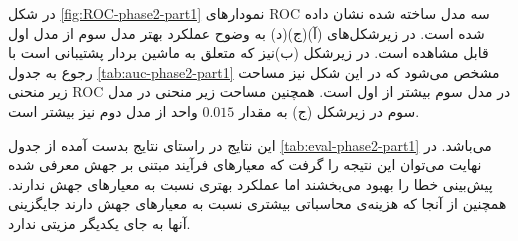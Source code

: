 در شکل \ref{fig:ROC-phase2-part1} نمودارهای ROC سه مدل ساخته شده نشان داده شده است. در زیرشکل‌های (آ)(ج)(د) به وضوح عملکرد بهتر مدل سوم از مدل اول قابل مشاهده است. در زیرشکل (ب)نیز که متعلق به ماشین بردار پشتیبانی است با رجوع به جدول \ref{tab:auc-phase2-part1} مشخص می‌شود که در این شکل نیز مساحت زیر منحنی ROC در مدل سوم بیشتر از اول است. همچنین مساحت زیر منحنی در مدل سوم در زیرشکل (ج) به مقدار $0.015$ واحد از مدل دوم نیز بیشتر است. 

این نتایج در راستای نتایج بدست آمده از جدول \ref{tab:eval-phase2-part1} می‌باشد. در نهایت می‌توان این نتیجه را گرفت که معیارهای فرآیند مبتنی بر جهش معرفی شده پیش‌بینی خطا را بهبود می‌بخشند  اما عملکرد بهتری نسبت به معیارهای جهش ندارند. همچنین از آنجا که هزینه‌ی محاسباتی بیشتری نسبت به معیارهای جهش دارند جایگزینی آنها به جای یکدیگر مزیتی ندارد. 

